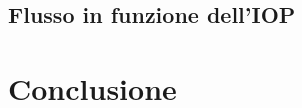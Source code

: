 \documentclass{article}
\begin{document}
\FloatBarrier
\subsection{Flusso in funzione dell'IOP}
\section{Conclusione}





\end{document}
